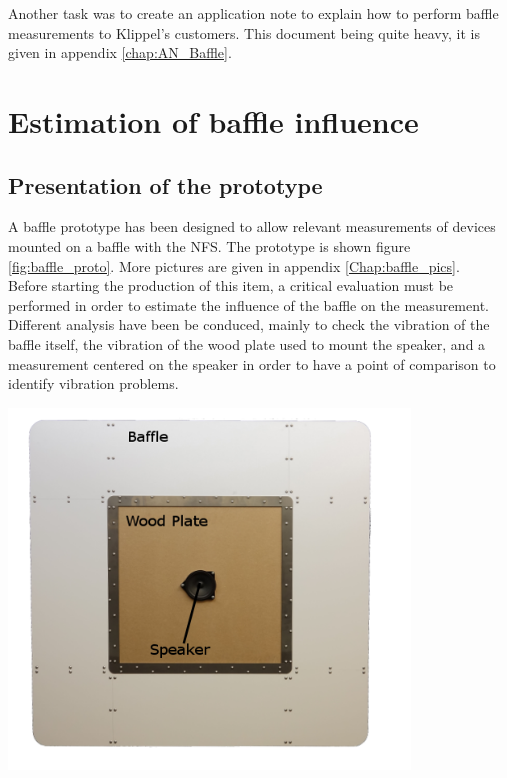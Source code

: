 \documentclass{report}
\begin{document}
Another task was to create an application note to explain how to perform baffle measurements to Klippel's customers. This document being quite heavy, it is given in appendix \ref{chap:AN_Baffle}.

\section{Estimation of baffle influence}

\subsection{Presentation of the prototype}

\begin{minipage}{0.6\textwidth}
A baffle prototype has been designed to allow relevant measurements of devices mounted on a baffle with the NFS. The prototype is shown figure \ref{fig:baffle_proto}. More pictures are given in appendix \ref{Chap:baffle_pics}. \\

Before starting the production of this item, a critical evaluation must be performed in order to estimate the influence of the baffle on the measurement. Different analysis have been be conduced, mainly to check the vibration of the baffle itself, the vibration of the wood plate used to mount the speaker, and a measurement centered on the speaker in order to have a point of comparison to identify vibration problems.
\end{minipage}
\begin{minipage}{0.4\textwidth}
\begin{center}
	\includegraphics[width=0.8\textwidth]{GridOpti/Baffle_Alone_2} 
    \captionsetup{hypcap=false} 
	\label{fig:baffle_proto}
\end{center}
\end{minipage} 
\end{document}
